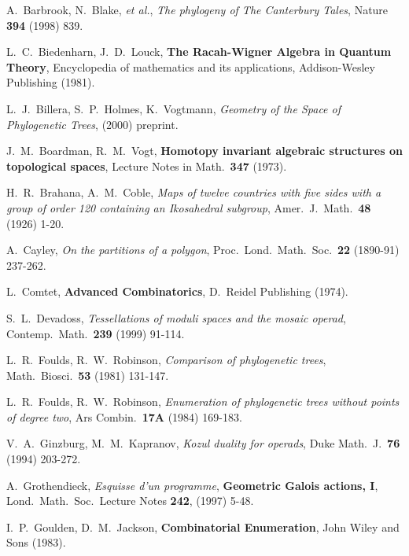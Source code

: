 \documentclass[10pt]{amsart}
\begin{document}
    \clearpage
    
                        
    
    \begin{thebibliography}{ADM9}
    \baselineskip=12pt
    
     A.\ Barbrook, N.\ Blake, {\em et al.}, {\em The phylogeny of The Canterbury Tales}, Nature {\bf 394} (1998) 839.
    
     L.\ C.\ Biedenharn, J.\ D.\ Louck, {\bf The Racah-Wigner Algebra in Quantum Theory}, Encyclopedia of mathematics and its applications, Addison-Wesley Publishing (1981).
    
    
     L.\ J.\ Billera, S.\ P.\ Holmes, K.\ Vogtmann, {\em Geometry of the Space of Phylogenetic Trees}, (2000) preprint.
    
     J.\ M.\ Boardman, R.\ M.\ Vogt, {\bf Homotopy invariant algebraic structures on topological spaces}, Lecture Notes in Math.\ {\bf 347} (1973).
    
    
     H.\ R.\ Brahana, A.\ M.\ Coble, {\em Maps of twelve countries with five sides with a group of order 120 containing an Ikosahedral subgroup}, Amer.\ J.\ Math.\ {\bf 48} (1926) 1-20.
    
     A.\ Cayley, {\em On the partitions of a polygon}, Proc.\ Lond.\ Math.\ Soc.\ {\bf 22} (1890-91) 237-262.
    
     L.\ Comtet, {\bf Advanced Combinatorics}, D.\ Reidel Publishing (1974).
    
     S.\ L.\ Devadoss, {\em Tessellations of moduli spaces and the mosaic operad},  Contemp.\ Math.\ {\bf 239} (1999) 91-114.
    
     L.\ R.\ Foulds, R.\ W.\ Robinson, {\em Comparison of phylogenetic trees},  Math.\ Biosci.\ {\bf 53} (1981) 131-147.
    
     L.\ R.\ Foulds, R.\ W.\ Robinson, {\em Enumeration of phylogenetic trees without points of degree two},  Ars Combin.\ {\bf 17A} (1984) 169-183.
    
     V.\ A.\ Ginzburg, M.\ M.\ Kapranov, {\em Kozul duality for operads},  Duke Math.\ J.\ {\bf 76} (1994) 203-272.
    
     A.\ Grothendieck, {\em Esquisse d'un programme}, {\bf Geometric Galois actions, I}, Lond.\ Math.\ Soc.\ Lecture Notes {\bf 242}, (1997) 5-48.
    
     I.\ P.\ Goulden, D.\ M.\ Jackson, {\bf Combinatorial Enumeration}, John Wiley and Sons (1983).
    

\end{thebibliography}
\end{document}
